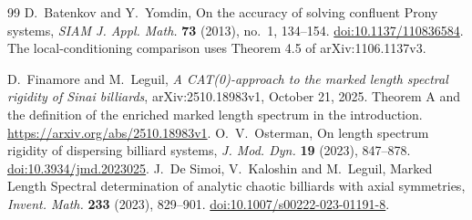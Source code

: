 \begin{thebibliography}{99}
D.~Batenkov and Y.~Yomdin, On the accuracy of solving confluent Prony
systems, \emph{SIAM J. Appl. Math.} \textbf{73} (2013), no.~1,
134--154. \href{https://doi.org/10.1137/110836584}{doi:10.1137/110836584}.
The local-conditioning comparison uses Theorem 4.5 of
arXiv:1106.1137v3.

D.~Finamore and M.~Leguil, \emph{A CAT(0)-approach to the marked
length spectral rigidity of Sinai billiards}, arXiv:2510.18983v1,
October 21, 2025. Theorem A and the definition of the enriched
marked length spectrum in the introduction.
\url{https://arxiv.org/abs/2510.18983v1}.
O.~V.~Osterman, On length spectrum rigidity of dispersing billiard
systems, \emph{J. Mod. Dyn.} \textbf{19} (2023), 847--878.
\href{https://doi.org/10.3934/jmd.2023025}{doi:10.3934/jmd.2023025}.
J.~De Simoi, V.~Kaloshin and M.~Leguil,
Marked Length Spectral determination of analytic chaotic billiards
with axial symmetries, \emph{Invent. Math.} \textbf{233} (2023),
829--901.
\href{https://doi.org/10.1007/s00222-023-01191-8}{doi:10.1007/s00222-023-01191-8}.
\end{thebibliography}
